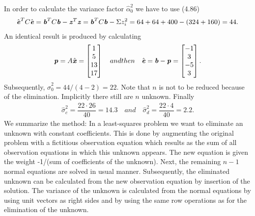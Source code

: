 In order to calculate the variance factor $  \hat{\alpha}^{2}_{0} $ we have to use (4.86)
\begin{align*}
\hat{\textbf{\textit{e}}}^{T}C \hat{\textbf{\textit{e}}} =
\textbf{\textit{b}}^{T}C\textbf{\textit{b}} - \textbf{\textit{z}}^{T}\textbf{\textit{z}} = \textbf{\textit{b}}^{T}C\textbf{\textit{b}} -
\Sigma z^{2}_{i} = 64 + 64 + 400 - (324 + 160) = 44.
\end{align*}
An identical result is produced by calculating
\begin{align*}
\textbf{\textit{p}} = A\hat{\textbf{\textit{x}}} =
\begin{bmatrix}
1\\
5\\
13\\
17
\end{bmatrix} \quad
and then \quad
\hat{\textbf{\textit{e}}} = \textbf{\textit{b}} - \textbf{\textit{p}} =
\begin{bmatrix}
-1\\
3\\
-5\\
3
\end{bmatrix}.
\end{align*}
Subsequently, $ \hat{\sigma}^{2}_{0} = 44/(4-2) = 22$. Note that $n$ is not to be reduced because of the elimination. Implicitly there still are $n$ unknown. Finally
\begin{align*}
\hat{\sigma}^{2}_{c} = \dfrac{22\cdot 26}{40} = 14.3 
\quad 
and
\quad
\hat{\sigma}^{2}_{d} = \dfrac{22\cdot 4}{40} = 2.2. 
\end{align*}
We summarize the method: In a least-squares problem we want to eliminate an unknown with constant coefficients. This is done by augmenting the original problem with a fictitious observation equation which results as the sum of all observation equations in which this unknown appears. The new equation is given the weight -1/(sum of coefficients of the unknown). Next, the remaining $n-1$ normal equations are solved in usual manner. Subsequently, the eliminated unknown can be calculated from the new observation equation by insertion of the solution. The variance of the unknown is calculated from the normal equations by using unit vectors as right sides and by using the same row operations as for the elimination of the unknown.

